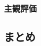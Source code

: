 \documentclass[12pt]{jarticle}
\numberwithin{equation}{section}    %
\numberwithin{figure}{section}      %
\numberwithin{table}{section}      %
\begin{document}

\subsubsection{主観評価}

\clearpage

\subsection{まとめ}

\clearpage

\end{document}
